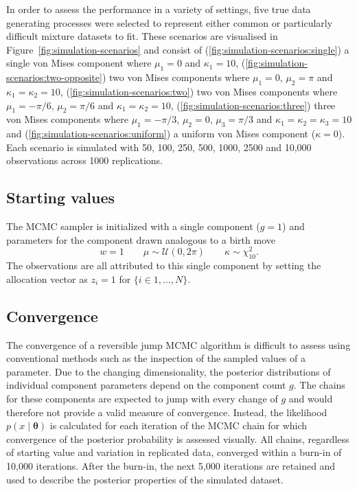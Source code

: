 In order to assess the performance in a variety of settings, five true data generating processes were selected to represent either common or particularly difficult mixture datasets to fit. These scenarios are visualised in Figure~\ref{fig:simulation-scenarios} and consist of (\ref{fig:simulation-scenarios:single}) a single von Mises component where $\mu_1 = 0$ and $\kappa_1 = 10$, (\ref{fig:simulation-scenarios:two-opposite}) two von Mises components where $\mu_1 = 0$, $\mu_2 = \pi$ and $\kappa_1 = \kappa_2 = 10$, (\ref{fig:simulation-scenarios:two}) two von Mises components where $\mu_1 = -\pi/6$, $\mu_2 = \pi/6$ and $\kappa_1 = \kappa_2 = 10$, (\ref{fig:simulation-scenarios:three}) three von Mises components where $\mu_1 = -\pi/3$, $\mu_2 = 0$, $\mu_3 = \pi/3$ and $\kappa_1 = \kappa_2 = \kappa_3 = 10$ and (\ref{fig:simulation-scenarios:uniform}) a uniform von Mises component ($\kappa = 0$). Each scenario is simulated with 50, 100, 250, 500, 1000, 2500 and 10,000 observations across 1000 replications.

\subsection{Starting values}
\label{starting-values}
The MCMC sampler is initialized with a single component ($g = 1$) and parameters for the component drawn analogous to a birth move
\begin{equation}
w = 1 \qquad \mu \sim \mathcal{U}(0, 2\pi) \qquad \kappa \sim \chi^2_{10}.
\end{equation}
The observations are all attributed to this single component by setting the allocation vector as $z_i = 1$ for $\{i \in 1,\dotsc,N\}$.

\subsection{Convergence}
The convergence of a reversible jump MCMC algorithm is difficult to assess using conventional methods such as the inspection of the sampled values of a parameter. Due to the changing dimensionality, the posterior distributions of individual component parameters depend on the component count $g$. The chains for these components are expected to jump with every change of $g$ and would therefore not provide a valid measure of convergence. Instead, the likelihood $p(x \mid \bm \theta)$ is calculated for each iteration of the MCMC chain for which convergence of the posterior probability is assessed visually. All chains, regardless of starting value and variation in replicated data, converged within a burn-in of 10,000 iterations. After the burn-in, the next 5,000 iterations are retained and used to describe the posterior properties of the simulated dataset.

